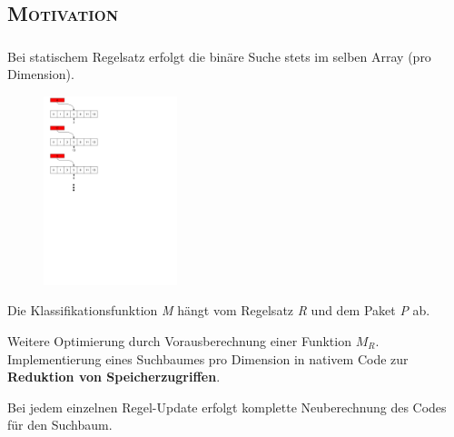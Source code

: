 \documentclass[xcolor=x11names,compress]{beamer}
\renewcommand{\(}{\begin{columns}}
\renewcommand{\)}{\end{columns}}
\newcommand{\<}[1]{\begin{column}{#1}}
\renewcommand{\>}{\end{column}}
\begin{document}
\subsection{\scshape Motivation}
\begin{frame}
  \frametitle{\insertsubsection}
  Bei statischem Regelsatz erfolgt die binäre Suche stets im selben Array (pro Dimension).\\
  \begin{figure}
  \centering
  \includegraphics[height=5.5cm]{figures/matching_process}
  \end{figure}
\end{frame}

\begin{frame}
  \begin{tcolorbox}[colback=teal!5!white,colframe=teal!75!black,title=Erinnerung,drop fuzzy shadow]
  Die Klassifikationsfunktion \textit{M} hängt vom Regelsatz \textit{R} und dem Paket \textit{P} ab.
  \end{tcolorbox}
  \pause
  \begin{tcolorbox}[colback=blue!5!white,colframe=blue!75!black,title=Idee,drop fuzzy shadow]
  Weitere Optimierung durch Vorausberechnung einer Funktion $M_R$.\\
  Implementierung eines Suchbaumes pro Dimension in nativem Code zur \textbf{Reduktion von Speicherzugriffen}.
  \end{tcolorbox}
  \pause
  \begin{tcolorbox}[colback=red!5!white,colframe=red!75!black,title=Nachteil,drop fuzzy shadow]
  Bei jedem einzelnen Regel-Update erfolgt komplette Neuberechnung des Codes für den Suchbaum.
  \end{tcolorbox}
\end{frame}
\end{document}
